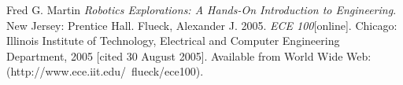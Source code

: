 \documentclass[a4paper, 11pt]{article}
\begin{document}
    
\begin{thebibliography}{9}
	 Fred G. Martin \emph{Robotics Explorations: A Hands-On Introduction to Engineering}. New Jersey: Prentice Hall.
	  Flueck, Alexander J. 2005. \emph{ECE 100}[online]. Chicago: Illinois Institute of Technology, Electrical and Computer Engineering Department, 2005 [cited 30
	August 2005]. Available from World Wide Web: (http://www.ece.iit.edu/~flueck/ece100).
\end{thebibliography}
    
\end{document}
